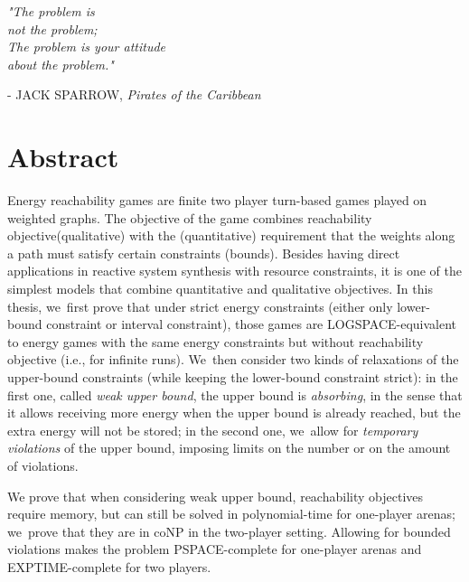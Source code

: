 \documentclass[a4paper,12pt, twoside]{book}
\newlength\longest
\theoremstyle{definition}
\begin{document}
\settowidth{}
\begin{center}
\parbox{\longest}{%
  \raggedright{\huge\itshape%
   "The problem is \\ 
  not the problem; \\
  The problem is your attitude \\ 
  about the problem."\par\bigskip
  }   
  \raggedleft\Large\MakeUppercase{- Jack Sparrow}, \textit{Pirates of the Caribbean}\par%
}
\end{center}

\vfill\vfill

\chapter*{Abstract}
Energy reachability games are finite two player turn-based games played on weighted graphs. The objective of the game combines reachability objective(qualitative) with the (quantitative) requirement that the weights along a path must satisfy certain constraints (bounds). Besides having direct applications in reactive system synthesis with resource constraints, it is one of the simplest models that combine quantitative and qualitative objectives.
\vskip 0.5cm
In this thesis, we~first prove that under strict energy constraints (either only
lower-bound constraint or interval constraint), those games are
LOGSPACE-equivalent to energy games with the same energy constraints but without reachability objective (i.e., for infinite
runs). We~then consider two kinds of
relaxations of the upper-bound constraints (while keeping the
lower-bound constraint strict): in the first one, called \emph{weak
upper bound}, the upper bound is \emph{absorbing}, in the sense that
it allows receiving more energy when the upper bound is already
reached, but the extra energy will not be stored; in the second one,
we~allow for \emph{temporary violations} of the upper bound, imposing
limits on the number or on the amount of violations.

%
We prove that when considering weak upper bound, reachability
objectives require memory, but can still be solved in polynomial-time
for one-player arenas; we~prove that they are in coNP in the two-player
setting. Allowing for bounded violations makes the
problem PSPACE-complete for one-player arenas and EXPTIME-complete
for two players.

\chapter*{%
}
\end{document}
